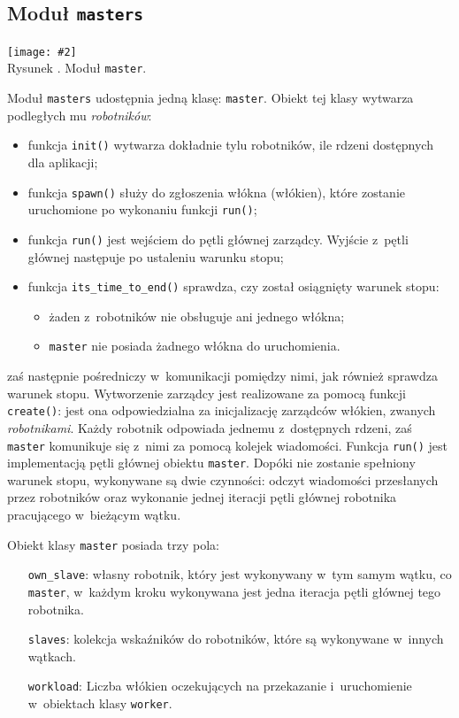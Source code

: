 \documentclass[12pt]{mwart}
\newcommand{\code}{\texttt}
\newcommand{\procbr}{()}
\newcounter{figmain}
\newcommand{\myownfigure}[4]{ \newcounter{#1} \setcounter{#1}{\value{figmain}} \addtocounter{figmain}{1} \begin{center} \label{fig:#1} \centering \texttt{[image: \#2]}\\ \nopagebreak[4] Rysunek \arabic{#1}. #3. \end{center}}
\begin{document}
\subsection{Moduł \code{masters}}
    \myownfigure{Master}{Master.png}{Moduł \code{master}}{.7}
%
\indent
  Moduł \code{masters} udostępnia jedną klasę: \code{master}.
  Obiekt tej klasy wytwarza podległych mu \emph{robotników}:  
  \begin{itemize}
    \item funkcja \code{init()} wytwarza dokładnie tylu robotników, ile rdzeni dostępnych dla aplikacji;
    \item funkcja \code{spawn()} służy do zgłoszenia włókna (włókien), które zostanie uruchomione po wykonaniu funkcji \code{run()};
    \item funkcja \code{run()} jest wejściem do pętli głównej zarządcy. Wyjście z~pętli głównej następuje po ustaleniu warunku stopu;
    \item funkcja \code{its\_time\_to\_end()} sprawdza, czy został osiągnięty warunek stopu:
      \begin{itemize}
        \item żaden z~robotników nie obsługuje ani jednego włókna;
        \item \code{master} nie posiada żadnego włókna do uruchomienia.
      \end{itemize}
  \end{itemize}
  zaś następnie pośredniczy w~komunikacji pomiędzy nimi, jak również sprawdza warunek stopu.
  Wytworzenie zarządcy jest realizowane za pomocą funkcji \code{create()}: 
  jest ona odpowiedzialna za inicjalizację zarządców włókien, zwanych \emph{robotnikami}.
  Każdy robotnik odpowiada jednemu z~dostępnych rdzeni, zaś
  \code{master} komunikuje się z~nimi za pomocą kolejek wiadomości.
  Funkcja \code{run\procbr} jest implementacją pętli głównej obiektu \code{master}. Dopóki nie zostanie spełniony warunek stopu,
  wykonywane są dwie czynności: odczyt wiadomości przesłanych przez robotników oraz wykonanie jednej iteracji pętli głównej
  robotnika pracującego w~bieżącym wątku.
\par
\indent
  Obiekt klasy \code{master} posiada trzy pola:
  \begin{itemize}
    \item[\code{own\_slave}:] własny robotnik, który jest wykonywany w~tym samym wątku, co \code{master}, 
      w~każdym kroku wykonywana jest jedna iteracja pętli głównej tego robotnika.
    \item[\code{slaves}:] kolekcja wskaźników do robotników, które są wykonywane w~innych wątkach.
    \item[\code{workload}:] Liczba włókien oczekujących na przekazanie i~uruchomienie w~obiektach klasy \code{worker}.
  \end{itemize}
\par
\end{document}
